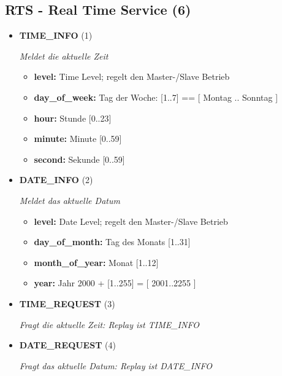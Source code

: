 \subsection{RTS - Real Time Service (6)}
\begin{itemize}
		
\item \textbf{TIME\_INFO} (1)

\textit{Meldet die aktuelle Zeit}

\small
\begin{itemize}
		
\item \textbf{level:} Time Level; regelt den Master-/Slave Betrieb
\item \textbf{day\_of\_week:} Tag der Woche: [1..7] == [ Montag .. Sonntag ]
\item \textbf{hour:} Stunde [0..23]
\item \textbf{minute:} Minute [0..59]
\item \textbf{second:} Sekunde [0..59]
\end{itemize}
\normalsize
	
\item \textbf{DATE\_INFO} (2)

\textit{Meldet das aktuelle Datum}

\small
\begin{itemize}
		
\item \textbf{level:} Date Level; regelt den Master-/Slave Betrieb
\item \textbf{day\_of\_month:} Tag des Monats [1..31] 
\item \textbf{month\_of\_year:} Monat [1..12] 
\item \textbf{year:} Jahr 2000 + [1..255] = [ 2001..2255 ]
\end{itemize}
\normalsize
	
\item \textbf{TIME\_REQUEST} (3)

\textit{Fragt die aktuelle Zeit: Replay ist TIME\_INFO}

\item \textbf{DATE\_REQUEST} (4)

\textit{Fragt das aktuelle Datum: Replay ist DATE\_INFO}

\end{itemize}
	
